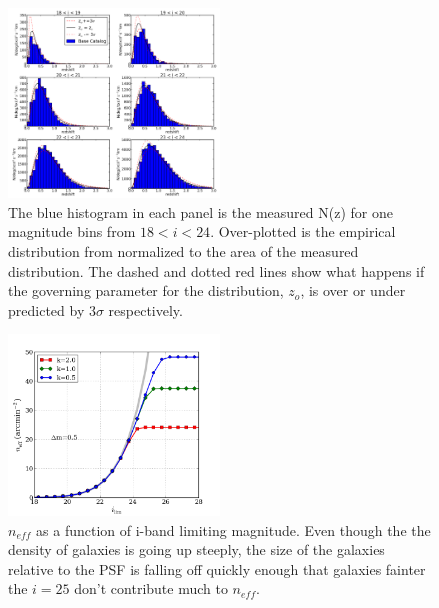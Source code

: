 \documentclass[11pt]{article}
\begin{document}
\begin{figure}[h]
\centering
\includegraphics[width=0.5\textwidth]{validation_figures/Nofz_18_24.png}
\caption{The blue histogram in each panel is the measured N(z) for one
  magnitude bins from $18<i<24$.  Over-plotted is the empirical
  distribution from \citet{coil04} normalized to the area of the
  measured distribution.  The dashed and dotted red lines show what
  happens if the governing parameter for the \citet{coil04}
  distribution, $z_o$, is over or under predicted by $3\sigma$
  respectively.\label{fig:nofz18_24}}
\end{figure}
\begin{figure}[h]
\centering
\includegraphics[width=0.5\textwidth]{validation_figures/neff_m_ir.png}
\caption{$n_{eff}$ as a function of i-band limiting magnitude.  Even though the the density of galaxies is going up steeply, the 
size of the galaxies relative to the PSF is falling off quickly enough that galaxies fainter the $i=25$ don't contribute much to $n_{eff}$.\label{fig:neffvm}}
\end{figure}
\end{document}
